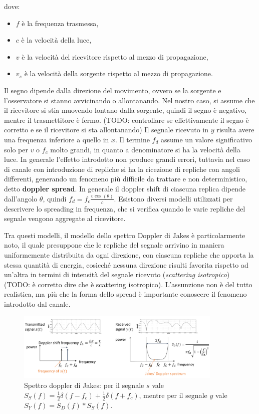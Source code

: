 dove:
\begin{itemize}
    \item $f$ è la frequenza trasmessa,
    \item $c$ è la velocità della luce,
    \item $v$ è la velocità del ricevitore rispetto al mezzo di propagazione,
    \item $v_s$ è la velocità della sorgente rispetto al mezzo di propagazione.
\end{itemize}


Il segno dipende dalla direzione del movimento, ovvero se la sorgente e l'osservatore si stanno avvicinando o allontanando. Nel nostro caso, si assume che il ricevitore si stia muovendo lontano dalla sorgente, quindi il segno è negativo, mentre il trasmettitore è fermo.
(TODO: controllare se effettivamente il segno è corretto e se il ricevitore si sta allontanando)
Il segnale ricevuto in $y$ risulta avere una frequenza inferiore a quello in $x$. Il termine $f_d$ assume un valore significativo solo per $v$ o $f_c$ molto grandi, in quanto a denominatore si ha la velocità della luce. In generale l'effetto introdotto non produce grandi errori, tuttavia nel caso di canale con introduzione di repliche si ha la ricezione di repliche con angoli differenti, generando un fenomeno più difficile da trattare e non deterministico, detto \textbf{doppler spread}.
In generale il doppler shift di ciascuna replica dipende dall'angolo $\theta$, quindi $f_d = f_c \frac{v \cos(\theta)}{c}$.
Esistono diversi modelli utilizzati per descrivere lo spreading in frequenza,
che si verifica quando le varie repliche del segnale vengono aggregate al ricevitore.

Tra questi modelli, il modello dello spettro Doppler di Jakes è particolarmente noto, il quale presuppone che le repliche del segnale arrivino in maniera uniformemente distribuita da ogni direzione, con ciascuna repliche che apporta la stessa quantità di energia, cosicché nessuna direzione risulti favorita rispetto ad un'altra in termini di intensità del segnale ricevuto (\textit{scattering isotropico}) (TODO: è corretto dire che è scattering isotropico).
L'assunzione non è del tutto realistica, ma più che la forma dello spread è importante conoscere il fenomeno introdotto dal canale.

\begin{figure}[ht]
    \centering
    \includegraphics[width=0.875\textwidth]{imgs/jakes.jpg}
    \captionsetup{width=.5\textwidth}
    \caption*{Spettro doppler di Jakes:
        per il segnale $s$ vale \( S_S(f) = \frac{1}{2} \delta \left(f - f_c \right) + \frac{1}{2} \delta \left(f + f_c\right) \),
        mentre per il segnale $y$ vale \( S_Y(f) = S_D(f) \ast S_S(f) \).
    }
\end{figure}

